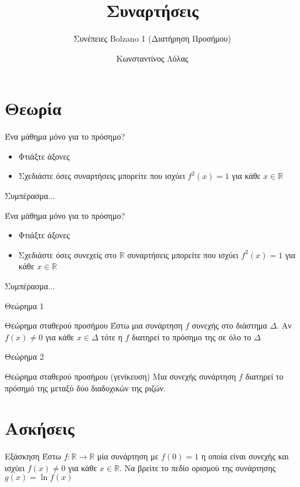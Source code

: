 \documentclass[greek]{beamer}
\title{Συναρτήσεις}
\subtitle{Συνέπειες Bolzano 1 (Διατήρηση Προσήμου)}
\author[Λόλας]{Κωνσταντίνος Λόλας}
\institute[$10^ο$ ΓΕΛ]{$10^ο$ ΓΕΛ Θεσσαλονίκης}
\date{}
\begin{document}
\begin{frame}
  \titlepage
\end{frame}

\section{Θεωρία}
\begin{frame}{Ένα μάθημα μόνο για το πρόσημο?}
  \begin{itemize}
    \item Φτιάξτε άξονες \pause
    \item Σχεδιάστε όσες συναρτήσεις μπορείτε που ισχύει $f^2(x)=1$ για κάθε $x\in \mathbb{R}$ \pause
  \end{itemize}
  Συμπέρασμα...
\end{frame}

\begin{frame}{Ένα μάθημα μόνο για το πρόσημο?}
  \begin{itemize}
    \item Φτιάξτε άξονες \pause
    \item Σχεδιάστε όσες συνεχείς στο $\mathbb{R}$ συναρτήσεις μπορείτε που ισχύει $f^2(x)=1$ για κάθε $x\in \mathbb{R}$ \pause
  \end{itemize}
  Συμπέρασμα...
\end{frame}

\begin{frame}{Θεώρημα 1}
  \begin{block}{Θεώρημα σταθερού προσήμου}
    Έστω μια συνάρτηση $f$ συνεχής στο διάστημα $Δ$. Αν $f(x)\ne 0$ για κάθε $x\in Δ$ τότε η $f$ διατηρεί το πρόσημο της σε όλο το $Δ$
  \end{block}
\end{frame}

\begin{frame}{Θεώρημα 2}
  \begin{block}{Θεώρημα σταθερού προσήμου (γενίκευση)}
    Μια συνεχής συνάρτηση $f$ διατηρεί το πρόσημό της μεταξύ δύο διαδοχικών της ριζών.
  \end{block}
\end{frame}

\section{Ασκήσεις}
\begin{frame}{Εξάσκηση}
  Έστω $f:\mathbb{R}\to\mathbb{R}$ μία συνάρτηση με $f(0)=1$ η οποία είναι συνεχής και ισχύει $f(x)\ne 0$ για κάθε $x\in\mathbb{R}$. Να βρείτε το πεδίο ορισμού της συνάρτησης $g(x)=\ln f(x)$
\end{frame}
\end{document}
